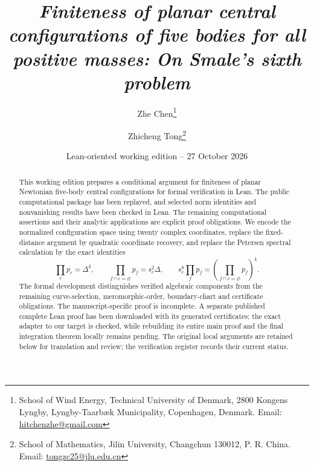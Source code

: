\documentclass[Threeside,11pt]{article}
\theoremstyle{definition}
\theoremstyle{remark}
\numberwithin{equation}{section}
\theoremstyle{remark}
\begin{document}
\title{{\sl Finiteness of planar central configurations of five
bodies for all positive masses: On Smale's sixth problem}}
\author{Zhe Chen\thanks{School of Wind Energy, Technical University of Denmark,
2800 Kongens Lyngby, Lyngby-Taarb\ae k Municipality, Copenhagen, Denmark.
Email: \url{hitchenzhe@gmail.com}}
\and
Zhicheng Tong\thanks{School of Mathematics, Jilin University,
Changchun 130012, P. R. China. Email: \url{tongzc25@jlu.edu.cn}}}
\date{Lean-oriented working edition -- 27 October 2026}
\maketitle

\begin{abstract}
This working edition prepares a conditional argument for finiteness of planar
Newtonian five-body central configurations for formal verification in Lean.
The public computational package has been replayed, and selected norm
identities and nonvanishing results have been checked in Lean. The remaining
computational assertions and their analytic applications are explicit proof
obligations. We encode the normalized
configuration space using twenty complex coordinates, replace the fixed-distance
argument by quadratic coordinate recovery, and replace the Petersen spectral
calculation by the exact identities
\[
 \prod_e p_e=\Delta^4,\qquad
 \prod_{f\cap e=\varnothing}p_f=s_e^2\Delta,
 \qquad s_e^8\prod_f p_f=
       \left(\prod_{f\cap e=\varnothing}p_f\right)^4.
\]
The formal development distinguishes verified algebraic components from the
remaining curve-selection, meromorphic-order, boundary-chart and certificate
obligations. The manuscript-specific proof is incomplete. A separate published
complete Lean proof has been downloaded with its generated certificates; the
exact adapter to our target is checked, while rebuilding its entire main proof
and the final integration theorem locally remains pending.
The original local arguments are retained below for translation and review;
the verification register records their current status.
\end{abstract}

\tableofcontents
\end{document}
